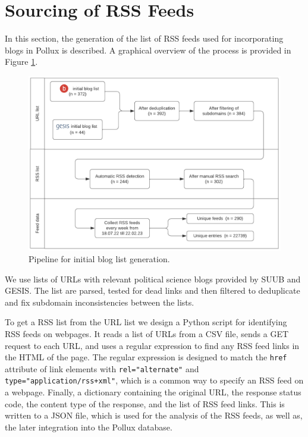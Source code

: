 \documentclass{article}
\begin{document}
\section{Sourcing of RSS Feeds}\label{sec:sourcing}
In this section, the generation of the list of RSS feeds used for incorporating blogs in Pollux is described. A graphical overview of the process is provided in Figure \ref{fig:rss_generation}.

\begin{figure}[htb]
	\centering
	\includegraphics[width=.7\textwidth]{figures/generation_of_initial_list.png}
	\caption{Pipeline for initial blog list generation.}
	\label{fig:rss_generation}
\end{figure}

We use lists of URLs with relevant political science blogs provided by SUUB and GESIS. The list are parsed, tested for dead links and then filtered to deduplicate and fix subdomain inconsistencies between the lists.

To get a RSS list from the URL list we design a Python script for identifying RSS feeds on webpages. It reads a list of URLs from a CSV file, sends a GET request to each URL, and uses a regular expression to find any RSS feed links in the HTML of the page. The regular expression is designed to match the \texttt{href} attribute of link elements with \texttt{rel="alternate"} and \texttt{type="application/rss+xml"}, which is a common way to specify an RSS feed on a webpage. Finally, a dictionary containing the original URL, the response status code, the content type of the response, and the list of RSS feed links. This is written to a JSON file, which is used for the analysis of the RSS feeds, as well as, the later integration into the Pollux database.
\end{document}
